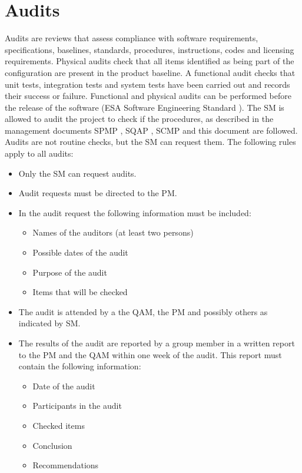 \section{Audits}
    Audits are reviews that assess compliance with software requirements, specifications, baselines,
    standards, procedures, instructions, codes and licensing requirements. Physical audits check that
    all items identified as being part of the configuration are present in the product baseline. A
    functional audit checks that unit tests, integration tests and system tests have been carried out
    and records their success or failure. Functional and physical audits can be performed before
    the release of the software (ESA Software Engineering Standard \cite{esa}). The SM is
    allowed to audit the project to check if the procedures, as described in the management
    documents SPMP \cite{spmp}, SQAP \cite{sqap}, SCMP \cite{scmp} and this document are followed. Audits are not routine
    checks, but the SM can request them.
        The following rules apply to all audits:
\begin{itemize}
\item Only the SM can request audits.
\item Audit requests must be directed to the PM.
\item In the audit request the following information must be included:
\begin{itemize}
\item Names of the auditors (at least two persons)
\item Possible dates of the audit
\item Purpose of the audit
\item Items that will be checked
\end{itemize}
\item The audit is attended by a the QAM, the PM and possibly others as indicated by SM.
\item The results of the audit are reported by a group member in a written report to the PM and the QAM within one week of the audit. This report must contain the following information:

	\begin{itemize}
	\item Date of the audit
	\item Participants in the audit
	\item Checked items
	\item Conclusion
	\item Recommendations
	\end{itemize}
\end{itemize}


